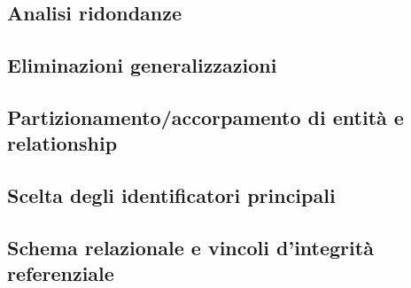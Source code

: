 \subsection{Analisi ridondanze}
	
	
\subsection{Eliminazioni generalizzazioni}


\subsection{Partizionamento/accorpamento di entità e relationship}


\subsection{Scelta degli identificatori principali}


\subsection{Schema relazionale e vincoli d'integrità referenziale}
